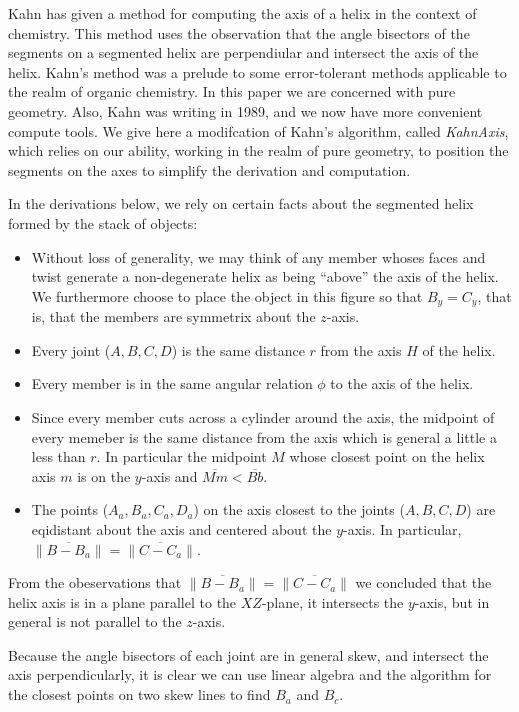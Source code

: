 \documentclass[11pt]{article}
\begin{document}
{Kahn\cite{kahn1989defining} has given a method for computing the axis of a helix in the context of chemistry.
This method uses the observation that the angle bisectors of the segments on a segmented helix are perpendiular
and intersect the axis of the helix. Kahn's method was a prelude to some error-tolerant methods applicable to
the realm of organic chemistry. In this paper we are concerned with pure geometry. Also, Kahn was writing in 1989,
and we now have more convenient compute tools. We give here a modifcation of Kahn's algorithm, called {\em KahnAxis},
which relies on our ability, working in the realm of pure geometry, to position the segments on the axes
to simplify the derivation and computation.

In the derivations below, we rely on certain facts about
the segmented helix formed by the stack of objects:
\begin{itemize}
\item Without loss of generality, we may think of any member whoses faces
  and twist generate a non-degenerate helix as being ``above'' the
  axis of the helix. We furthermore choose to place the object in
  this figure so that $B_y = C_y$, that is, that the members are symmetrix
  about the $z$-axis. 
\item Every joint ($A,B,C,D$) is the same distance $r$ from the axis $H$ of the helix.
\item Every member is in the same angular relation $\phi$ to the axis of the helix.
\item Since every member cuts across a cylinder around the axis,
  the midpoint of every memeber is the same distance from the axis
  which is general a little a less than $r$. In particular the midpoint $M$
  whose closest point on the helix axis $m$ is on the $y$-axis and
  $\overline{Mm} < \overline{Bb}$.
\item The points ($A_a,B_a,C_a,D_a$) on the axis closest to the joints ($A,B,C,D$)
  are eqidistant about the axis and centered about the $y$-axis. In
  particular, $\| \overline{B - B_a} \| = \| \overline{C - C_a} \|$.
\end{itemize}

From the obeservations that $\| \overline{B - B_a} \| = \| \overline{C - C_a} \|$
we concluded that the helix axis is in a plane
parallel to the $XZ$-plane, it intersects the $y$-axis, but in general is
not parallel to the $z$-axis. 

Because the angle bisectors of each joint are in general skew, and intersect the
axis perpendicularly, it is clear we can use linear algebra and the algorithm
for the closest points on two skew lines to find $B_a$ and $B_c$.

}
\end{document}
